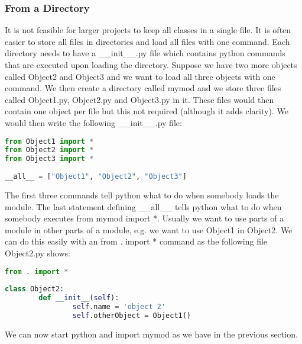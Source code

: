 \subsubsection{From a Directory}
It is not feasible for larger projects to keep all classes in a single file. It
is often easier to store all files in directories and load all files with one
command. Each directory needs to have a \_\_init\_\_.py file which contains python
commands that are executed upon loading the directory.  Suppose we have two more
objects called Object2 and Object3 and we want to load all three objects with
one command. We then create a directory called mymod and we store three files
called Object1.py, Object2.py and Object3.py in it. These files would then
contain one object per file but this not required (although it adds clarity). We
would then write the following \_\_init\_\_.py file:
\lstset{basicstyle=\scriptsize, numbers=left, captionpos=b, tabsize=4}
\begin{lstlisting}[caption=Module from Dir,language={Python},
xleftmargin=15pt, label=lst:modulefromdir]
from Object1 import *
from Object2 import *
from Object3 import *
 
__all__ = ["Object1", "Object2", "Object3"]
\end{lstlisting}

The first three commands tell python what to do when somebody loads the module.
The last statement defining \_\_all\_\_ tells python what to do when somebody
executes from mymod import *. Usually we want to use parts of a module in other
parts of a module, e.g. we want to use Object1 in Object2. We can do this easily
with an from . import * command as the following file Object2.py shows:
\lstset{basicstyle=\scriptsize, numbers=left, captionpos=b, tabsize=4}
\begin{lstlisting}[caption=Import current Dir,language={Python},
xleftmargin=15pt, label=lst:importcurrentdir]
from . import *
 
class Object2:
        def __init__(self):
                self.name = 'object 2'
                self.otherObject = Object1()
\end{lstlisting}
We can now start python and import mymod as we have in the previous section.
